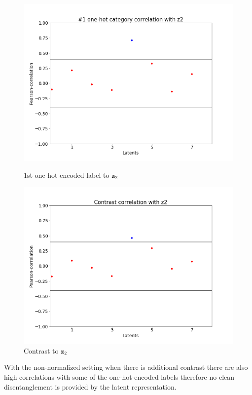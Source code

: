 \documentclass[12pt, english]{article}
\begin{document}
\vspace{4mm}

\begin{figure}[H]
\begin{minipage}[b]{0.5\linewidth}
    \centering
    \includegraphics[width=.72\linewidth]{label-contrast-corr/cat-1-to-z2-corr.png} 
    \caption{$1$st one-hot encoded label to $\bm{z}_{2}$} 
    \label{fig:label-contrast-corr-1}
\end{minipage}%
\begin{minipage}[b]{0.5\linewidth}
    \centering
    \includegraphics[width=.72\linewidth]{label-contrast-corr/contrast-to-z2-corr.png} 
    \caption{Contrast to $\bm{z}_{2}$} 
    \label{fig:label-contrast-corr-2}
\end{minipage} 
\end{figure}

\par With the non-normalized setting when there is additional contrast there are also high correlations with some of the one-hot-encoded labels therefore no clean disentanglement is provided by the latent representation.

\vspace{4mm}
\end{document}
